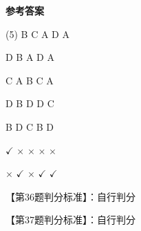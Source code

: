 \documentclass[11pt, a4paper]{article}
\begin{document}
\begin{center}
    \Huge \textbf{参考答案}
\end{center}

    \begin{tasks}[label=\arabic*. , label-width=14pt](5)
        \task B
        \task C
        \task A
        \task D
        \task A

        \task D
        \task B
        \task A
        \task D
        \task A

        \task C
        \task A
        \task B
        \task C
        \task A

        \task D
        \task B
        \task D
        \task D
        \task C

        \task B
        \task D
        \task C
        \task B
        \task D

        \task $\checkmark$
        \task $\times$
        \task $\times$
        \task $\times$
        \task $\times$

        \task $\times$
        \task $\checkmark$
        \task $\times$
        \task $\checkmark$
        \task $\checkmark$
    \end{tasks}

    【第36题判分标准】：自行判分

    【第37题判分标准】：自行判分
\end{document}
